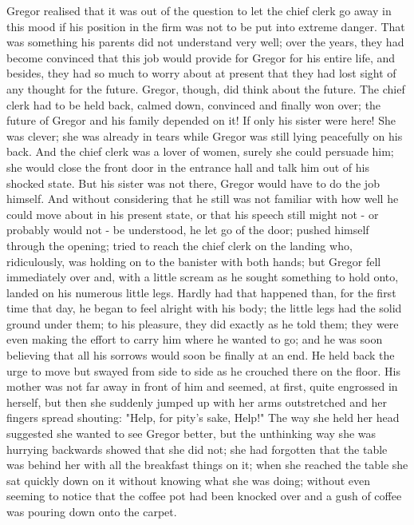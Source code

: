 Gregor realised that it was out of the question to let the chief clerk go away in this mood if his position in the firm was not to be put into extreme danger. That was something his parents did not understand very well; over the years, they had become convinced that this job would provide for Gregor for his entire life, and besides, they had so much to worry about at present that they had lost sight of any thought for the future. Gregor, though, did think about the future. The chief clerk had to be held back, calmed down, convinced and finally won over; the future of Gregor and his family depended on it! If only his sister were here! She was clever; she was already in tears while Gregor was still lying peacefully on his back. And the chief clerk was a lover of women, surely she could persuade him; she would close the front door in the entrance hall and talk him out of his shocked state. But his sister was not there, Gregor would have to do the job himself. And without considering that he still was not familiar with how well he could move about in his present state, or that his speech still might not - or probably would not - be understood, he let go of the door; pushed himself through the opening; tried to reach the chief clerk on the landing who, ridiculously, was holding on to the banister with both hands; but Gregor fell immediately over and, with a little scream as he sought something to hold onto, landed on his numerous little legs. Hardly had that happened than, for the first time that day, he began to feel alright with his body; the little legs had the solid ground under them; to his pleasure, they did exactly as he told them; they were even making the effort to carry him where he wanted to go; and he was soon believing that all his sorrows would soon be finally at an end. He held back the urge to move but swayed from side to side as he crouched there on the floor. His mother was not far away in front of him and seemed, at first, quite engrossed in herself, but then she suddenly jumped up with her arms outstretched and her fingers spread shouting: "Help, for pity's sake, Help!" The way she held her head suggested she wanted to see Gregor better, but the unthinking way she was hurrying backwards showed that she did not; she had forgotten that the table was behind her with all the breakfast things on it; when she reached the table she sat quickly down on it without knowing what she was doing; without even seeming to notice that the coffee pot had been knocked over and a gush of coffee was pouring down onto the carpet.

